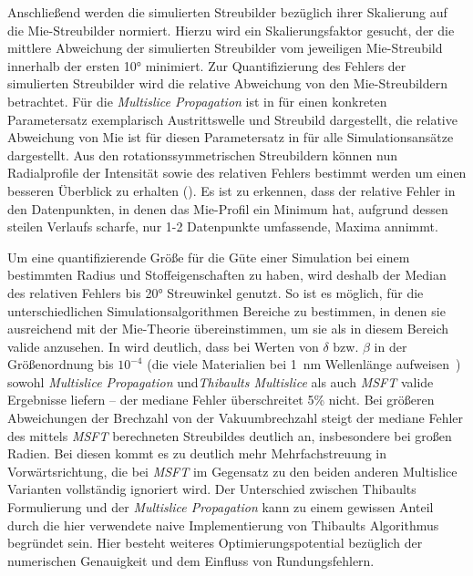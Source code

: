 Anschließend werden die simulierten Streubilder bezüglich ihrer Skalierung auf die Mie-Streubilder normiert. Hierzu wird ein Skalierungsfaktor gesucht, der die mittlere Abweichung der simulierten Streubilder vom jeweiligen Mie-Streubild innerhalb der ersten 10° minimiert. Zur Quantifizierung des Fehlers der simulierten Streubilder wird die relative Abweichung von den Mie-Streubildern betrachtet. Für die \textit{Multislice Propagation} ist in  für einen konkreten Parametersatz exemplarisch Austrittswelle und Streubild dargestellt, die relative Abweichung von Mie ist für diesen Parametersatz in  für alle Simulationsansätze dargestellt. Aus den rotationssymmetrischen Streubildern können nun Radialprofile der Intensität sowie des relativen Fehlers bestimmt werden um einen besseren Überblick zu erhalten (). Es ist zu erkennen, dass der relative Fehler in den Datenpunkten, in denen das Mie-Profil ein Minimum hat, aufgrund dessen steilen Verlaufs scharfe, nur 1-2 Datenpunkte umfassende, Maxima annimmt.

Um eine quantifizierende Größe für die Güte einer Simulation bei einem bestimmten Radius und Stoffeigenschaften zu haben, wird deshalb der Median des relativen Fehlers bis 20° Streuwinkel genutzt. So ist es möglich, für die unterschiedlichen Simulationsalgorithmen Bereiche zu bestimmen, in denen sie ausreichend mit der Mie-Theorie übereinstimmen, um sie als in diesem Bereich valide anzusehen. In  wird deutlich, dass bei Werten von $\delta$ bzw. $\beta$ in der Größenordnung bis $10^{-4}$ (die viele Materialien bei \SI{1}{nm} Wellenlänge aufweisen~\cite{henke}) sowohl \textit{Multislice Propagation} und\textit{Thibaults Multislice} als auch \textit{MSFT} valide Ergebnisse liefern -- der mediane Fehler überschreitet 5\% nicht. Bei größeren Abweichungen der Brechzahl von der Vakuumbrechzahl steigt der mediane Fehler des mittels \textit{MSFT} berechneten Streubildes deutlich an, insbesondere bei großen Radien. Bei diesen kommt es zu deutlich mehr Mehrfachstreuung in Vorwärtsrichtung, die bei \textit{MSFT} im Gegensatz zu den beiden anderen Multislice Varianten vollständig ignoriert wird. Der Unterschied zwischen Thibaults Formulierung und der \textit{Multislice Propagation} kann zu einem gewissen Anteil durch die hier verwendete naive Implementierung von Thibaults Algorithmus begründet sein. Hier besteht weiteres Optimierungspotential bezüglich der numerischen Genauigkeit und dem Einfluss von Rundungsfehlern.

